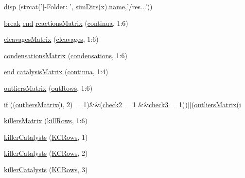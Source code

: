 \begin{DoxyCompactItemize}
\hyperlink{a00029_a609f02c862f2843febf3408f688be8e8}{disp} (strcat('$\vert$-\/Folder\+: ', \hyperlink{a00031_aae5035eb84b89176ed5b06e136325eff}{sim\+Dirs}(\hyperlink{a00031_a7265972fe485274cfff77a9bb07b8fce}{x}).\hyperlink{a00027_abbf559a76fab59203496b0847ab9502a}{name},'/res...'))
\item 
\hyperlink{a00029_a91cf6fbebedd86150a36e5ac3d5d3bfc}{break} \hyperlink{a00025_afb358f48b1646c750fb9da6c6585be2b}{end} \hyperlink{a00029_af998036b749d9fa6dd2365f9937279b6}{reactions\+Matrix} (\hyperlink{a00030_a9c951ebd5bc3f1adce943bee1255f4d6}{continua}, 1\+:6)
\item 
\hyperlink{a00029_a01fa14c111dc166a634dbb35b9cf9845}{cleavages\+Matrix} (\hyperlink{a00030_a89060c6979e5a4ff7b0985b35f295695}{cleavages}, 1\+:6)
\item 
\hyperlink{a00029_aa0f4762ac55d55c1b1ff073f9a5c3603}{condensations\+Matrix} (\hyperlink{a00030_ad3aa27d88a7e9d77d8334155860269bb}{condensations}, 1\+:6)
\item 
\hyperlink{a00025_afb358f48b1646c750fb9da6c6585be2b}{end} \hyperlink{a00029_acd65be0940a1307851b57c0d864fd32a}{catalysis\+Matrix} (\hyperlink{a00030_a9c951ebd5bc3f1adce943bee1255f4d6}{continua}, 1\+:4)
\item 
\hyperlink{a00029_aa5604b86cead7c2e2115f5e809f94465}{outliers\+Matrix} (\hyperlink{a00030_a60cfb1ca20cbbc81b85a8f56658b7c99}{out\+Rows}, 1\+:6)
\item 
\hyperlink{a00029_a70d494ea7ebc6a0b4ed59c685a43b83a}{if} ((\hyperlink{a00030_a9733b61dd859b1133aa3aa849cf70cbc}{outliers\+Matrix}(\hyperlink{a00113_ad3efca1ea6e3333daf30719ee0501862}{i}, 2)==1)\&\&(\hyperlink{a00030_a98a8838a85ed24032563a44271b1525a}{check2}==1 \&\&\hyperlink{a00030_adfd17509248a56986475a25ee50fe488}{check3}==1))$\vert$$\vert$(\hyperlink{a00030_a9733b61dd859b1133aa3aa849cf70cbc}{outliers\+Matrix}(\hyperlink{a00113_ad3efca1ea6e3333daf30719ee0501862}{i}
\item 
\hyperlink{a00029_ab372fd9c8bb38cf3c78e995c0698b0ca}{killers\+Matrix} (\hyperlink{a00030_a0e22d9868b850c50dfc13f5d28db8c30}{kill\+Rows}, 1\+:6)
\item 
\hyperlink{a00029_a62080a60371e18b8bd9ea0262d930070}{killer\+Catalysts} (\hyperlink{a00029_a62227634d3ceda9bf932c630583da2b9}{K\+C\+Rows}, 1)
\item 
\hyperlink{a00029_a62e3e9df13337b149661778a56e2f312}{killer\+Catalysts} (\hyperlink{a00029_a62227634d3ceda9bf932c630583da2b9}{K\+C\+Rows}, 2)
\item 
\hyperlink{a00029_af035121149449dd8d2faa4421fb6c880}{killer\+Catalysts} (\hyperlink{a00029_a62227634d3ceda9bf932c630583da2b9}{K\+C\+Rows}, 3)
$$
\end{DoxyCompactItemize}
